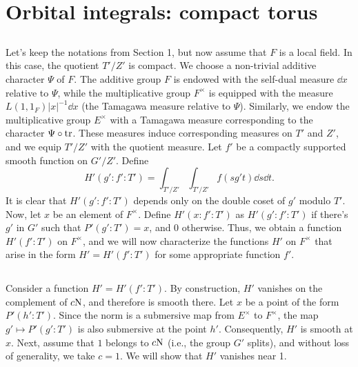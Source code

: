 \section{Orbital integrals: compact torus}

\subsection{}
Let's keep the notations from Section 1, but now assume that $F$ is a local field.
In this case, the quotient $T'/Z'$ is compact.
We choose a non-trivial additive character $\Psi$ of $F$.
The additive group $F$ is endowed with the self-dual measure $\dd x$ relative to $\Psi$, while the multiplicative group $F^\times$ is equipped with the measure $L(1, 1_F)|x|^{-1} \dd x$ (the Tamagawa measure relative to $\Psi$).
Similarly, we endow the multiplicative group $E^\times$ with a Tamagawa measure corresponding to the character $\Psi \circ \mathrm{tr}$.
These measures induce corresponding measures on $T'$ and $Z'$, and we equip $T'/Z'$ with the quotient measure.
Let $f'$ be a compactly supported smooth function on $G'/Z'$.
Define
\begin{equation}
    H'(g':f':T') = \int_{T'/Z'} \int_{T'/Z'} f(sg't) \dd s \dd t.
\end{equation}
It is clear that $H'(g':f':T')$ depends only on the double coset of $g'$ modulo $T'$.
Now, let $x$ be an element of $F^\times$.
Define $H'(x:f':T')$ as $H'(g':f':T')$ if there's $g'$ in $G'$ such that $P'(g':T') = x$, and 0 otherwise.
Thus, we obtain a function $H'(f':T')$ on $F^\times$, and we will now characterize the functions $H'$ on $F^\times$ that arise in the form $H' = H'(f':T')$ for some appropriate function $f'$.

\subsection{}
Consider a function $H' = H'(f':T')$. By construction, $H'$ vanishes on the complement of $c\mathrm{N}$, and therefore is smooth there. Let $x$ be a point of the form $P'(h':T')$.
Since the norm is a submersive map from $E^\times$ to $F^\times$, the map $g' \mapsto P'(g':T')$ is also submersive at the point $h'$. 
Consequently, $H'$ is smooth at $x$.
Next, assume that $1$ belongs to $c\mathrm{N}$ (i.e., the group $G'$ splits), and without loss of generality, we take $c = 1$.
We will show that $H'$ vanishes near 1.

